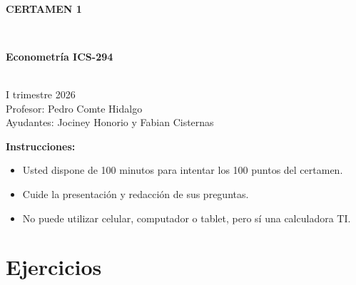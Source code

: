 \documentclass[10pt,a4paper]{article}
\begin{document}
\vspace{5cm}



\begin{center}
\begin{large}
\textbf{\\CERTAMEN 1}
\end{large}\\
\end{center}

\begin{center}
\begin{large}
\textbf{Econometría ICS-294}
\end{large}\\
\vspace{0.2cm}
I trimestre 2026\\
Profesor: Pedro Comte Hidalgo\\
Ayudantes: Jociney Honorio y Fabian Cisternas
\end{center}

\textbf{Instrucciones:} 

\begin{itemize}

    \item Usted dispone de 100 minutos  para intentar los 100 puntos del certamen.
    \item Cuide la presentación y redacción de sus preguntas.
    \item No puede utilizar celular, computador o tablet, pero sí una calculadora TI.
     
\end{itemize}

\section{Ejercicios}
\end{document}
